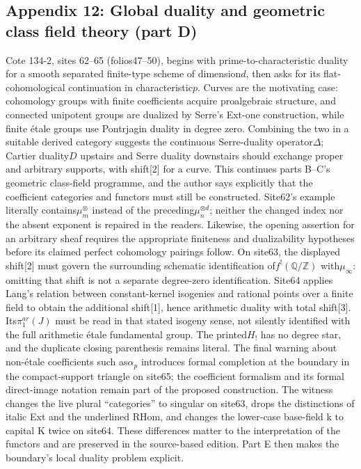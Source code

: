 \subsection*{Appendix 12: Global duality and geometric class field theory (part D)}
Cote 134-2, sites 62--65 (folios47--50), begins with prime-to-characteristic duality for a smooth separated finite-type scheme of dimension$d$, then asks for its flat-cohomological continuation in characteristic$p$. Curves are the motivating case: cohomology groups with finite coefficients acquire proalgebraic structure, and connected unipotent groups are dualized by Serre's Ext-one construction, while finite étale groups use Pontrjagin duality in degree zero. Combining the two in a suitable derived category suggests the continuous Serre-duality operator$\Delta$; Cartier duality$D$ upstairs and Serre duality downstairs should exchange proper and arbitrary supports, with shift[2] for a curve. This continues parts B--C's geometric class-field programme, and the author says explicitly that the coefficient categories and functors must still be constructed. Site62's example literally contains$\mu_m^{\otimes}$ instead of the preceding$\mu_n^{\otimes d}$; neither the changed index nor the absent exponent is repaired in the readers. Likewise, the opening assertion for an arbitrary sheaf requires the appropriate finiteness and dualizability hypotheses before its claimed perfect cohomology pairings follow. On site63, the displayed shift[2] must govern the surrounding schematic identification of$f^!(\mathbb Q/\mathbb Z)$ with$\mu_\infty$: omitting that shift is not a separate degree-zero identification. Site64 applies Lang's relation between constant-kernel isogenies and rational points over a finite field to obtain the additional shift[1], hence arithmetic duality with total shift[3]. Its$\pi_1^{ar}(J)$ must be read in that stated isogeny sense, not silently identified with the full arithmetic étale fundamental group. The printed$H_!$ has no degree star, and the duplicate closing parenthesis remains literal. The final warning about non-étale coefficients such as$\alpha_p$ introduces formal completion at the boundary in the compact-support triangle on site65; the coefficient formalism and its formal direct-image notation remain part of the proposed construction. The witness changes the live plural ``categories'' to singular on site63, drops the distinctions of italic Ext and the underlined RHom, and changes the lower-case base-field k to capital K twice on site64. These differences matter to the interpretation of the functors and are preserved in the source-based edition. Part E then makes the boundary's local duality problem explicit.

